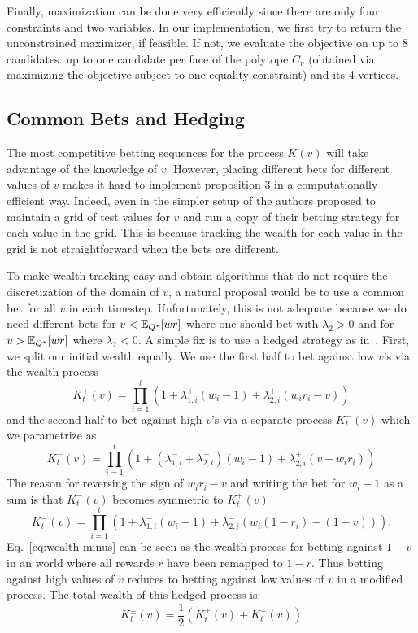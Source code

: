 Finally, maximization can be done very efficiently since there are 
only four constraints and two variables. In our implementation, we
first try to return the unconstrained maximizer, if feasible. 
If not, we evaluate the objective on up to 8 candidates: 
up to one candidate per face of the polytope $C_v$ 
(obtained via maximizing the objective subject to one equality constraint) 
and its 4 vertices.

\subsection{Common Bets and Hedging}
The most competitive betting sequences for the process
$K(v)$ will take advantage 
of the knowledge of $v$. However, placing different
bets for different values of $v$ makes it hard 
to implement proposition 3 in a computationally efficient 
way.
Indeed, even in the simpler setup of
\cite{waudby-smith_variance-adaptive_2020}
the authors proposed to maintain a grid of 
test values for $v$ and run a copy of their
betting strategy for each value in the grid.
This is because tracking the wealth for each
value in the grid is not straightforward when
the bets are different.  

To make wealth tracking easy and
obtain algorithms that do not require the 
discretization of the domain of $v$, a natural
proposal would be to use a common bet for 
all $v$ in each timestep. Unfortunately, 
this is not adequate because we do need 
different bets for $v<\mathbb{E}_{Q^*}[wr]$ where
one should bet with $\lambda_2 > 0$ and for 
$v>\mathbb{E}_{Q^*}[wr]$ where $\lambda_2 < 0$. 
A simple fix is to use a hedged 
strategy as in~\cite{waudby-smith_variance-adaptive_2020}.
First, we split our initial wealth equally.
We use the first half to bet against low $v$'s
via the wealth process
\[
K_t^{+}(v) = \prod_{i=1}^t \left(1+\lambda_{1,i}^{+}(w_i-1)+\lambda_{2,i}^{+}(w_i r_i -v)\right)
\]
and the second half to bet against high $v$'s
via a separate process $K_t^{-}(v)$ which we
parametrize as
\[
K_t^{-}(v) = \prod_{i=1}^t \left(1+(\lambda_{1,i}^{-}+\lambda_{2,i}^{-})(w_i-1)+\lambda_{2,i}^{+}(v-w_i r_i)\right)
\]
The reason for reversing the sign of $w_i r_i -v$ and 
writing the bet for $w_i-1$ as a sum is that $K_t^{-}(v)$
becomes symmetric to $K_t^{+}(v)$
\begin{equation}
K_t^{-}(v) = \prod_{i=1}^t \left(1+\lambda_{1,i}^{-}(w_i-1)+\lambda_{2,i}^{-}(w_i (1-r_i) -(1-v))\right).
\label{eq:wealth-minus} 
\end{equation}
Eq.~\eqref{eq:wealth-minus} 
can be seen as the wealth process for betting against $1-v$ 
in an world where all rewards $r$ have been remapped 
to $1-r$. Thus betting against high values of $v$ 
reduces to betting against low values of $v$ in a
modified process. The total wealth of this hedged process is:
\begin{equation}
K_t^{\pm}(v) = \frac{1}{2} (K_t^{+}(v) + K_t^{-}(v))
\label{eq:hedged}
\end{equation}

